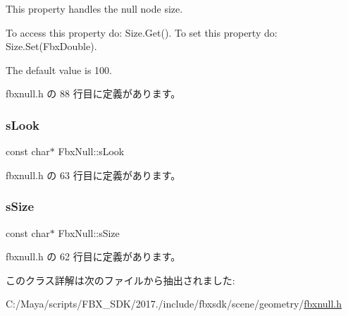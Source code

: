 This property handles the null node size.

To access this property do\+: Size.\+Get(). To set this property do\+: Size.\+Set(\+Fbx\+Double).

The default value is 100. 

 fbxnull.\+h の 88 行目に定義があります。

\mbox{\label{class_fbx_null_ac3a4f7217a304a8fd5d9259329874fc2}} 
\subsubsection{\texorpdfstring{s\+Look}{sLook}}
{\footnotesize\ttfamily const char$\ast$ Fbx\+Null\+::s\+Look\hspace{0.3cm}{\ttfamily [static]}}



 fbxnull.\+h の 63 行目に定義があります。

\mbox{\label{class_fbx_null_a4478c6006aabcab2bf8ca2a7b3677601}} 
\subsubsection{\texorpdfstring{s\+Size}{sSize}}
{\footnotesize\ttfamily const char$\ast$ Fbx\+Null\+::s\+Size\hspace{0.3cm}{\ttfamily [static]}}



 fbxnull.\+h の 62 行目に定義があります。



このクラス詳解は次のファイルから抽出されました\+:\begin{DoxyCompactItemize}
\item 
C\+:/\+Maya/scripts/\+F\+B\+X\+\_\+\+S\+D\+K/2017./include/fbxsdk/scene/geometry/\hyperlink{fbxnull_8h}{fbxnull.\+h}\end{DoxyCompactItemize}
